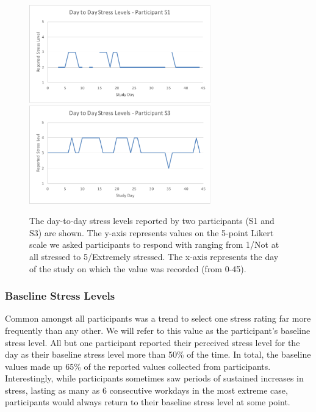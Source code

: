 \begin{figure}[h!]
  \centering
      \includegraphics[width=0.7\textwidth]{s1_stress.pdf}
      \includegraphics[width=0.7\textwidth]{s3_stress.pdf}
  \caption{The day-to-day stress levels reported by two participants (S1 and S3) are shown. The y-axis represents values on the 5-point Likert scale we asked participants to respond with ranging from 1/Not at all stressed to 5/Extremely stressed. The x-axis represents the day of the study on which the value was recorded (from 0-45). }
   \vspace*{-2mm}
   \label{fig:dailyStress}
\end{figure}


\subsubsection{Baseline Stress Levels}
Common amongst all participants was a trend to select one stress rating
far more frequently than any other. We will refer to this value as the
participant's baseline stress level. All but one participant reported
their perceived stress level for the day as their baseline stress
level more than 50\% of the time. In total, the baseline values made
up 65\% of the reported values collected from
participants. Interestingly, while participants sometimes saw periods
of sustained increases in stress, lasting as many as 6 consecutive
workdays in the most extreme case, participants would always return to
their baseline stress level at some point.


